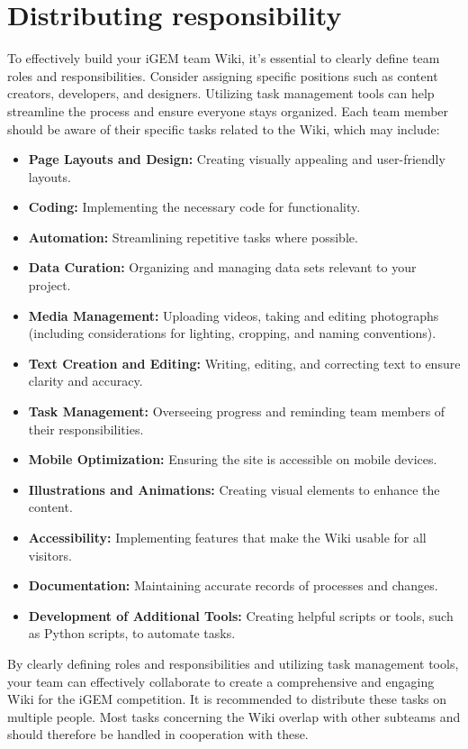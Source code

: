     \section{Distributing responsibility}
    To effectively build your iGEM team Wiki, it’s essential to clearly define team roles and responsibilities.
    Consider assigning specific positions such as content creators, developers, and designers.
    Utilizing task management tools can help streamline the process and ensure everyone stays organized.
    Each team member should be aware of their specific tasks related to the Wiki, which may include:
    \begin{itemize}
        \item \textbf{Page Layouts and Design:} Creating visually appealing and user-friendly layouts.
        \item \textbf{Coding:} Implementing the necessary code for functionality.
        \item \textbf{Automation:} Streamlining repetitive tasks where possible.
        \item \textbf{Data Curation:} Organizing and managing data sets relevant to your project.
        \item \textbf{Media Management:} Uploading videos, taking and editing photographs (including considerations for lighting, cropping, and naming conventions).
        \item \textbf{Text Creation and Editing:} Writing, editing, and correcting text to ensure clarity and accuracy.
        \item \textbf{Task Management:} Overseeing progress and reminding team members of their responsibilities.
        \item \textbf{Mobile Optimization:} Ensuring the site is accessible on mobile devices.
        \item \textbf{Illustrations and Animations:} Creating visual elements to enhance the content.
        \item \textbf{Accessibility:} Implementing features that make the Wiki usable for all visitors.
        \item \textbf{Documentation:} Maintaining accurate records of processes and changes.
        \item \textbf{Development of Additional Tools:} Creating helpful scripts or tools, such as Python scripts, to automate tasks.
    \end{itemize}
    By clearly defining roles and responsibilities and utilizing task management tools, your team can effectively collaborate to create a comprehensive and engaging Wiki for the iGEM competition.
    It is recommended to distribute these tasks on multiple people. \newline
    Most tasks concerning the Wiki overlap with other subteams and should therefore be handled in cooperation with these.

